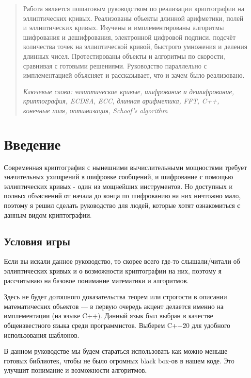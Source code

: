 
\begin{abstract}
  Работа является пошаговым руководством по реализации криптографии на эллиптических кривых. Реализованы объекты длинной арифметики, полей и эллиптических кривых. Изучены и имплементированы алгоритмы шифрования и дешифрования, электронной цифровой подписи, подсчёт количества точек на эллиптической кривой, быстрого умножения и деления длинных чисел. Протестированы объекты и алгоритмы по скорости, сравнивая с готовыми решениями. Руководство параллельно с имплементацией объясняет и рассказывает, что и зачем было реализовано.

  \textit{Ключевые слова: эллиптические кривые, шифрование и дешифрование, криптография, ECDSA, ECC, длинная арифметика, FFT, C++, конечные поля, оптимизация, Schoof's algorithm}
\end{abstract}

\section{Введение}
Современная криптография с нынешними вычислительными мощностями требует значительных ухищрений в шифровке сообщений, и шифрование с помощью эллиптических кривых - один из мощнейших инструментов. Но доступных и полных объяснений от начала до конца по шифрованию на них ничтожно мало, поэтому я решил сделать руководство для людей, которые хотят ознакомиться с данным видом криптографии.

\subsection{Условия игры}
 Если вы искали данное руководство, то скорее всего где-то слышали/читали об эллиптических кривых и о возможности криптографии на них, поэтому я рассчитываю на базовое понимание математики и алгоритмов.

Здесь не будет дотошного доказательства теорем или строгости в описании математических объектов --- в первую очередь акцент делается именно на имплементации (на языке C++). Данный язык был выбран в качестве общеизвестного языка среди программистов. Выберем C++20 для удобного использования шаблонов.

В данном руководстве мы будем стараться использовать как можно меньше готовых библиотек, чтобы не было огромных black box-ов в нашем коде. Это улучшит понимание и возможности алгоритмов.

